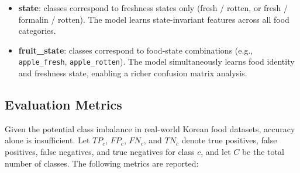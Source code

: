 \documentclass[12pt, a4paper]{article}
\begin{document}
\begin{itemize}
    \item \textbf{state}: classes correspond to freshness states only
    (fresh / rotten, or fresh / formalin / rotten). The model learns
    state-invariant features across all food categories.
    \item \textbf{fruit\_state}: classes correspond to food-state combinations
    (e.g., \texttt{apple\_fresh}, \texttt{apple\_rotten}). The model
    simultaneously learns food identity and freshness state, enabling a richer
    confusion matrix analysis.
\end{itemize}

\subsection{Evaluation Metrics}

Given the potential class imbalance in real-world Korean food datasets,
accuracy alone is insufficient.
Let $TP_c$, $FP_c$, $FN_c$, and $TN_c$ denote true positives, false positives,
false negatives, and true negatives for class $c$, and let $C$ be the total
number of classes.
The following metrics are reported:
\end{document}

